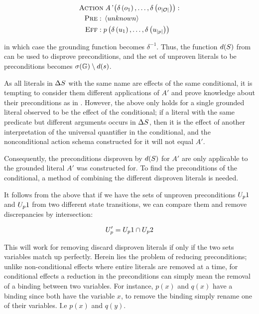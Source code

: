 \documentclass[\master/Master.tex]{subfiles}
\begin{document}
\begin{align*}
    \begin{split}
        \textsc{Action} &\; \textit{A'}\left(\delta \left( o_1 \right), \ldots, \delta \left( o_{|\mathcal{O}|}\right)\right): \\
        \textsc{Pre}: \; & \left< unknown \right> \\
        \textsc{Eff}: \; & p\left( \delta \left(u_1\right), \dots, \delta \left( u_{|p|} \right)\right)
    \end{split}
\end{align*}

in which case the grounding function becomes $\delta^{-1}$. Thus, the function $d(S)$ from  can be used to disprove preconditions, and the set of unproven literals to be preconditions becomes $\sigma(\mathbb{G}) \setminus d(s)$.

As all literals in $\Delta S$ with the same name are effects of the same conditional, it is tempting to consider them different applications of $A'$ and prove knowledge about their preconditions as in . However, the above only holds for a single grounded literal observed to be the effect of the conditional; if a literal with the same predicate but different arguments occurs in $\Delta S$, then it is the effect of another interpretation of the universal quantifier in the conditional, and the nonconditional action schema constructed for it will not equal $A'$.

Consequently, the preconditions disproven by $d(S)$ for $A'$ are only applicable to the grounded literal $A'$ was constructed for. To find the preconditions of the conditional, a method of combining the different disproven literals is needed.

It follows from the above that if we have the sets of unproven preconditions $U_p1$ and $U_p1$ from two different state transitions, we can compare them and remove discrepancies by intersection:

\begin{equation}
\label{eq:unknownpredcondset}
	U_p' = U_p1 \cap U_p2
\end{equation}

This will work for removing discard disproven literals if only if the two sets variables match up perfectly. Herein lies the problem of reducing preconditions; unlike non-conditional effects where entire literals are removed at a time, for conditional effects a reduction in the preconditions can simply mean the removal of a binding between two variables. For instance, $p(x)$ and $q(x)$ have a binding since both have the variable $x$, to remove the binding simply rename one of their variables. I.e $p(x)$ and $q(y)$.
\end{document}

